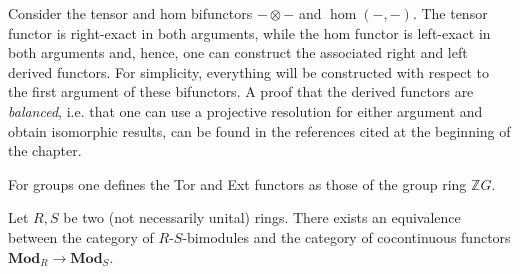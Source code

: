 	Consider the tensor and hom bifunctors $-\otimes-$ and $\hom(-,-)$. The tensor functor is right-exact in both arguments, while the hom functor is left-exact in both arguments and, hence, one can construct the associated right and left derived functors. For simplicity, everything will be constructed with respect to the first argument of these bifunctors. A proof that the derived functors are \textit{balanced}, i.e. that one can use a projective resolution for either argument and obtain isomorphic results, can be found in the references cited at the beginning of the chapter.

    \begin{remark}[Groups]
        For groups one defines the Tor and Ext functors as those of the group ring $\mathbb{Z}G$.
    \end{remark}

    \begin{theorem}
        Let $R,S$ be two (not necessarily unital) rings. There exists an equivalence between the category of $R\text{-}S$-bimodules and the category of cocontinuous functors $\mathbf{Mod}_R\rightarrow\mathbf{Mod}_S$.
    \end{theorem}

